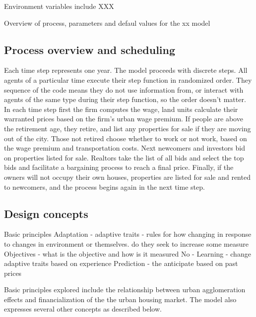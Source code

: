 {{Environment variables include XXX

Overview of process, parameters and defaul values for the xx model

\subsection{Process overview and scheduling}

Each time step represents one year. The model proceeds with discrete steps. All agents of a particular time execute their step function in randomized order. They sequence of the code means they do not use information from, or interact with agents of the same type during their step function, so the order doesn't matter. In each time step first the firm computes the wage, land units calculate their warranted prices based on the firm's urban wage premium. If people are above the retirement age, they retire, and list any properties for sale if they are moving out of the city. Those not retired choose whether to work or not work, based on the wage premium and transportation costs. Next newcomers and investors bid on properties listed for sale. Realtors take the list of all bids and select the top bids and facilitate a bargaining process to reach a final price. Finally, if the owners will not occupy their own houses, properties are listed for sale and rented to newcomers, and the process begins again in the next time step. 



\subsection{Design concepts}

Basic principles
Adaptation - adaptive traits - rules for  how changing in response to changes in environment or themselves. do they seek to increase some measure
Objectives - what is the objective and how is it measured
No - Learning - change adaptive traits based on experience
Prediction - the anticipate based on past prices





Basic principles explored include the relationship between urban agglomeration effects and financialization of the the urban housing market. The model also expresses several other concepts as described below.

}}
